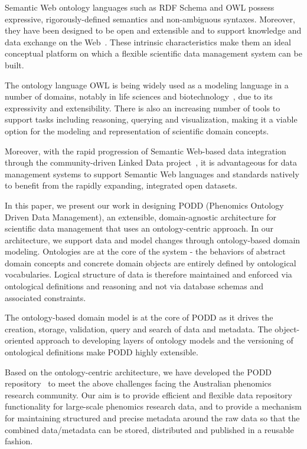 \documentclass[preprint,12pt]{elsarticle}
\begin{document}
Semantic Web ontology languages such as RDF Schema and OWL possess expressive, rigorously-defined semantics and non-ambiguous syntaxes. Moreover, they have been designed to be open and extensible and to support knowledge and data exchange on the Web~\cite{linkeddata,aue07dbpedia}. These intrinsic characteristics make them an ideal conceptual platform on which a flexible scientific data management system can be built.

The ontology language OWL is being widely used as a modeling language in a number of domains, notably in life sciences and biotechnology~\cite{journals/bib/RuttenbergRSM09,citeulike:1882392,citeulike:212874}, due to its expressivity and extensibility. There is also an increasing number of tools to support tasks including reasoning, querying and visualization, making it a viable option for the modeling and representation of scientific domain concepts.

Moreover, with the rapid progression of Semantic Web-based data integration through the community-driven Linked Data project~\cite{citeulike:5008761}, it is advantageous for data management systems to support Semantic Web languages and standards natively to benefit from the rapidly expanding, integrated open datasets. 

In this paper, we present our work in designing PODD (Phenomics Ontology Driven Data Management), an extensible, domain-agnostic architecture for scientific data management that uses an ontology-centric approach. In our architecture, we support data and model changes through ontology-based domain modeling. Ontologies are at the core of the system - the behaviors of abstract domain concepts and concrete domain objects are entirely defined by ontological vocabularies. Logical structure of data is therefore maintained and enforced via ontological definitions and reasoning and not via database schemas and associated constraints. 

The ontology-based domain model is at the core of PODD as it drives the creation, storage, validation, query and search of data and metadata. The object-oriented approach to developing layers of ontology models and the versioning of ontological definitions make PODD highly extensible. 

Based on the ontology-centric architecture, we have developed the PODD repository~\cite{podd_icadl} to meet the above challenges facing the Australian phenomics research community. Our aim is to provide efficient and flexible data repository functionality for large-scale phenomics research data, and to provide a mechanism for maintaining structured and precise metadata around the raw data so that the combined data/metadata can be stored, distributed and published in a reusable fashion. 
\end{document}
